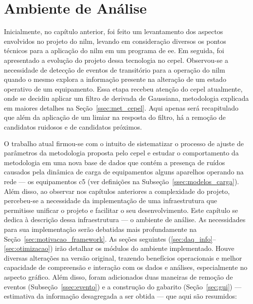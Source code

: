 \chapter{Ambiente de Análise}
\label{chap:framework}

Inicialmente, no capítulo anterior, foi feito um levantamento dos
aspectos envolvidos no projeto do \acs{nilm}, levando em consideração
diversos os pontos técnicos para a aplicação do \acs{nilm} em um programa
de \acs{ee}. Em seguida, foi apresentado a evolução do projeto dessa
tecnologia no \acs{cepel}.  Observou-se a necessidade de detecção de
eventos de transitório para a operação do \acs{nilm} quando o mesmo
explora a informação presente na alteração de um estado operativo de
um equipamento. Essa etapa recebeu atenção do \acs{cepel} atualmente,
onde se decidiu aplicar um filtro de derivada de Gaussiana,
metodologia explicada em maiores detalhes na
Seção~\ref{ssec:met_cepel}. Aqui apenas será recapitulado que além da
aplicação de um limiar na resposta do filtro, há a remoção de
candidatos ruidosos e de candidatos próximos.

O trabalho atual firmou-se com o intuito de sistematizar o processo de
ajuste de parâmetros da metodologia proposta pelo \acs{cepel} e
estudar o comportamento da metodologia em uma nova base de dados que
contém a presença de ruídos causados pela dinâmica de carga
de equipamentos alguns aparelhos operando na rede --- os equipamentos
\acs{c5} (ver definições na Subseção~\ref{ssec:modelos_carga}). 
Além disso, ao observar nos capítulos anteriores a complexidade do
projeto, percebeu-se a necessidade da implementação de uma
infraestrutura que permitisse unificar o projeto e facilitar o seu
desenvolvimento. Este capítulo se dedica à descrição dessa
infraestrutura --- o ambiente de análise. As necessidades para sua
implementação serão debatidas mais profundamente na
Seção~\ref{sec:motivacao_framework}. As seções seguintes
(\ref{sec:daq_info}--\ref{sec:otimizacao}) irão detalhar os módulos do
ambiente implementado. Houve diversas alterações na versão original,
trazendo benefícios operacionais e melhor capacidade de compreensão e
interação com os dados e análises, especialmente no aspecto gráfico.
Além disso, foram adicionados duas maneiras de remoção de eventos
(Subseção~\ref{ssec:evento}) e a construção do gabarito
(Seção~\ref{sec:gui}) --- estimativa da informação desagregada a ser
obtida --- que aqui são resumidos:

